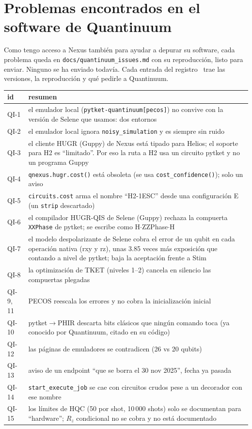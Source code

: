 \documentclass[11pt,a4paper]{article}
\newcommand{\code}[1]{\nolinkurl{#1}}
\begin{document}
\section{Problemas encontrados en el software de Quantinuum}
Como tengo acceso a Nexus tambi\'en para ayudar a depurar su software, cada problema queda en
\code{docs/quantinuum\_issues.md} con su reproducci\'on, listo para enviar. Ninguno se ha enviado todav\'ia. Cada entrada del registro~\cite{qilog} trae las versiones, la reproducci\'on y qu\'e pedirle a Quantinuum.
\begin{table}[h]\centering\small
\begin{tabular}{lp{11cm}}
\toprule
id & resumen\\
\midrule
QI-1 & el emulador local (\texttt{pytket-quantinuum[pecos]}) no convive con la versi\'on de Selene que usamos: dos entornos\\
QI-2 & el emulador local ignora \texttt{noisy\_simulation} y es siempre sin ruido\\
QI-3 & el cliente HUGR (Guppy) de Nexus est\'a tipado para Helios; el soporte para H2 es ``limitado''. Por eso la ruta a H2 usa un circuito pytket y no un programa Guppy\\
QI-4 & \texttt{qnexus.hugr.cost()} est\'a obsoleta (se usa \texttt{cost\_confidence()}); solo un aviso\\
QI-5 & \texttt{circuits.cost} arma el nombre ``H2-1ESC'' desde una configuraci\'on E (un \texttt{strip} descartado)\\
QI-6 & el compilador HUGR-QIS de Selene (Guppy) rechaza la compuerta \texttt{XXPhase} de pytket; se escribe como H$\cdot$ZZPhase$\cdot$H\\
QI-7 & el modelo despolarizante de Selene cobra el error de un qubit en cada operaci\'on nativa (rxy y rz), unas 3.85 veces m\'as exposici\'on que contando a nivel de pytket; baja la aceptaci\'on frente a Stim\\
QI-8 & la optimizaci\'on de TKET (niveles 1--2) cancela en silencio las compuertas plegadas\\
QI-9, 11 & PECOS reescala los errores y no cobra la inicializaci\'on inicial\\
QI-10 & pytket$\to$PHIR descarta bits cl\'asicos que ning\'un comando toca (ya conocido por Quantinuum, citado en su c\'odigo)\\
QI-12 & las p\'aginas de emuladores se contradicen (26 vs 20 qubits)\\
QI-13 & aviso de un endpoint ``que se borra el 30 nov 2025'', fecha ya pasada\\
QI-14 & \texttt{start\_execute\_job} se cae con circuitos crudos pese a un decorador con ese nombre\\
QI-15 & los l\'imites de HQC (50 por shot, 10\,000 shots) solo se documentan para ``hardware''; $R_z$ condicional no se cobra y no est\'a documentado\\
\bottomrule
\end{tabular}
\end{table}
\end{document}
